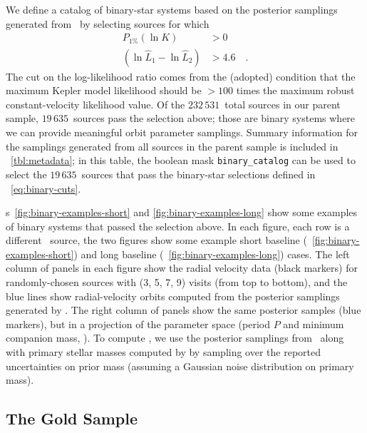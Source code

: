 \documentclass[modern]{aastex63}
\newcommand{\nsources}{\ensuremath{232\,531}}
\newcommand{\nbinary}{\ensuremath{19\,635}}
\begin{document}
We define a catalog of binary-star systems based on the posterior samplings
generated from \thejoker\ by selecting sources for which
\begin{align}
    P_{1\%}(\ln K) &> 0\\
    (\ln \hat{L}_1 - \ln \hat{L}_2) &> 4.6 \quad . \label{eq:binary-cuts}
\end{align}
The cut on the log-likelihood ratio comes from the (adopted) condition that
the maximum Kepler model likelihood should be $>100$ times the maximum robust
constant-velocity likelihood value.
Of the \nsources\ total sources in our parent sample, \nbinary\ sources pass the
selection above; those are binary systems where we can provide meaningful orbit
parameter samplings.
Summary information for the samplings generated from all sources in the parent
sample is included in \tablename~\ref{tbl:metadata}; in this table, the boolean
mask \texttt{binary\_catalog} can be used to select the \nbinary\ sources that
pass the binary-star selections defined in \equationname~\ref{eq:binary-cuts}.

\figurename s~\ref{fig:binary-examples-short} and \ref{fig:binary-examples-long}
show some examples of binary systems that passed the selection above.
In each figure, each row is a different \apogee\ source, the two figures show
some example short baseline (\figurename~\ref{fig:binary-examples-short}) and
long baseline (\figurename~\ref{fig:binary-examples-long}) cases.
The left column of panels in each figure show the radial velocity data (black
markers) for randomly-chosen sources with (3, 5, 7, 9) visits (from top to
bottom), and the blue lines show radial-velocity orbits computed from the
posterior samplings generated by \thejoker.
The right column of panels show the same posterior samples (blue markers), but
in a projection of the parameter space (period $P$ and minimum companion mass,
\mtwomin).
To compute \mtwomin, we use the posterior samplings from \thejoker\ along with
primary stellar masses computed by \citet{Queiroz:2019} by sampling over the
reported uncertainties on prior mass (assuming a Gaussian noise distribution on
primary mass).

\subsection{The Gold Sample}
\label{sec:gold-sample}
\end{document}
